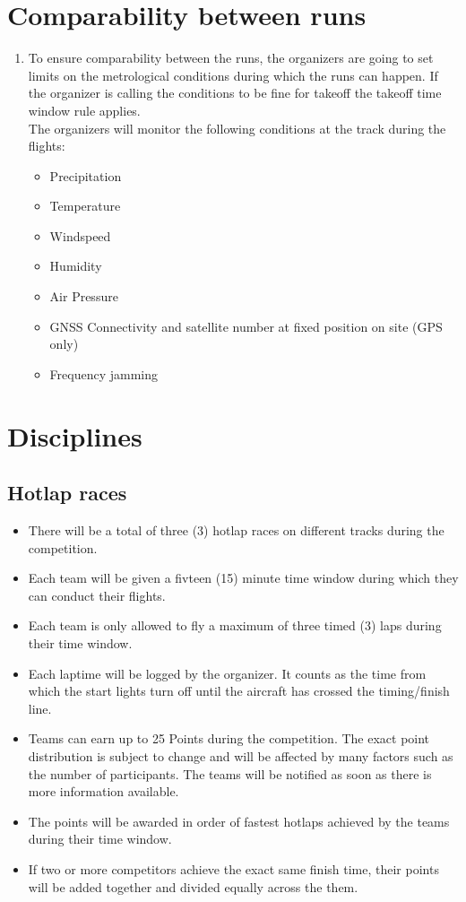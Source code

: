     \section{Comparability between runs}
    \begin{enumerate}
      \item To ensure comparability between the runs, the organizers are going to set limits on the metrological conditions during which the runs can happen. If the organizer is calling the conditions to be fine for takeoff the takeoff time window rule applies. \\
      The organizers will monitor the following conditions at the track during the flights:
      \begin{itemize}
        \item Precipitation
        \item Temperature 
        \item Windspeed
        \item Humidity
        \item Air Pressure
        \item GNSS Connectivity and satellite number at fixed position on site (GPS only) 
        \item Frequency jamming
      \end{itemize}

    \end{enumerate}

    \section{Disciplines}
    \subsection{Hotlap races}
    \begin{itemize}
      \item There will be a total of three (3) hotlap races on different tracks during the competition. 
      \item Each team will be given a fivteen (15) minute time window during which they can conduct their flights. 
      \item Each team is only allowed to fly a maximum of three timed (3) laps during their time window. 
      \item Each laptime will be logged by the organizer. It counts as the time from which the start lights turn off until the aircraft has crossed the timing/finish line. 
      \item Teams can earn up to 25 Points during the competition. The exact point distribution is subject to change and will be affected by many factors such as the number of participants.
      The teams will be notified as soon as there is more information available.
      \item The points will be awarded in order of fastest hotlaps achieved by the teams during their time window.
      \item If two or more competitors achieve the exact same finish time, their points will be added together and divided equally across the them.  
    \end{itemize}

  




